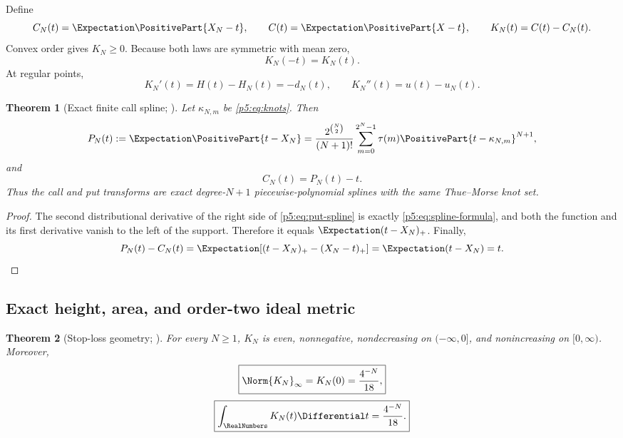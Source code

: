\documentclass[11pt,oneside]{article}
\numberwithin{equation}{section}
\newtheorem{theorem}{Theorem}[section]
\theoremstyle{definition}
\theoremstyle{remark}
\begin{document}
Define
\begin{equation}
 C_N(t)=\Expectation\PositivePart{X_N-t},
 \qquad
 C(t)=\Expectation\PositivePart{X-t},
 \qquad
 K_N(t)=C(t)-C_N(t).
 \label{p5:eq:call-def}
\end{equation}
Convex order gives $K_N\ge0$.  Because both laws are symmetric with mean zero,
\begin{equation}
 K_N(-t)=K_N(t).
 \label{p5:eq:K-even}
\end{equation}
At regular points,
\begin{equation}
 K_N'(t)=H(t)-H_N(t)=-d_N(t),
 \qquad
 K_N''(t)=u(t)-u_N(t).
 \label{p5:eq:K-derivatives}
\end{equation}

\begin{theorem}[Exact finite call spline; \newresult]
Let $\kappa_{N,m}$ be \eqref{p5:eq:knots}.  Then
\begin{equation}
 P_N(t):=\Expectation\PositivePart{t-X_N}
 =\frac{2^{\binom N2}}{(N+1)!}
 \sum_{m=0}^{2^N-1}\tau(m)\PositivePart{t-\kappa_{N,m}}^{N+1},
 \label{p5:eq:put-spline}
\end{equation}
and
\begin{equation}
 C_N(t)=P_N(t)-t.
 \label{p5:eq:call-spline}
\end{equation}
Thus the call and put transforms are exact degree-$N+1$ piecewise-polynomial splines with the same Thue--Morse knot set.
\end{theorem}

\begin{proof}
The second distributional derivative of the right side of \eqref{p5:eq:put-spline} is exactly \eqref{p5:eq:spline-formula}, and both the function and its first derivative vanish to the left of the support.  Therefore it equals $\Expectation(t-X_N)_+$.  Finally,
\[
 P_N(t)-C_N(t)=\Expectation[(t-X_N)_+-(X_N-t)_+]=\Expectation(t-X_N)=t.
\]
\end{proof}

\subsection{Exact height, area, and order-two ideal metric}

\begin{theorem}[Stop-loss geometry; \newresult]
For every $N\ge1$, $K_N$ is even, nonnegative, nondecreasing on $(-\infty,0]$, and nonincreasing on $[0,\infty)$.  Moreover,
\begin{equation}
 \boxed{
 \Norm{K_N}_\infty=K_N(0)=\frac{4^{-N}}{18},}
 \label{p5:eq:K-height}
\end{equation}
\begin{equation}
 \boxed{
 \int_{\RealNumbers}K_N(t)\Differential t=\frac{4^{-N}}{18}.}
 \label{p5:eq:K-area}
\end{equation}
\end{theorem}
\end{document}
